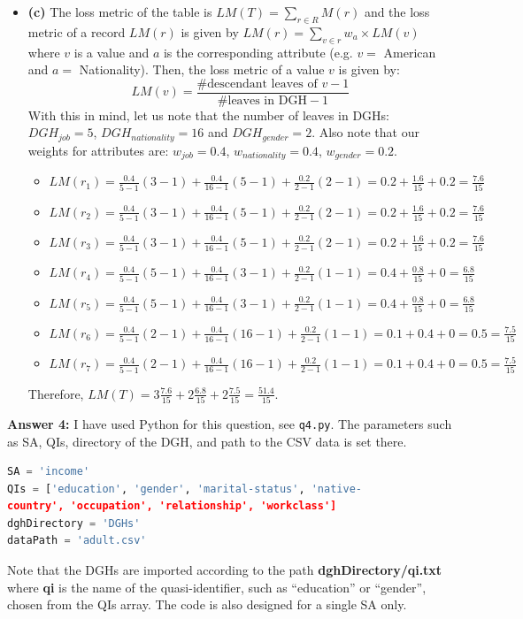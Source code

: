 \documentclass[12pt,reqno]{amsart}
\newcommand{\code}[1]{\texttt{#1}}
\begin{document}
\begin{itemize}[label=]
\item  \textbf{(c)} The loss metric of the table is $LM(T) = \sum_{r \in R}M(r)$ and the loss metric of a record $LM(r)$ is given by $LM(r) = \sum_{v \in r} w_{a} \times LM(v)$ where $v$ is a value and $a$ is the corresponding attribute (e.g. $v = $ American and $a = $ Nationality). Then, the loss metric of a value $v$ is given by:
$$
LM(v) = \frac{\text{\# descendant leaves of } v - 1 }{\text{\# leaves in DGH} - 1}
$$
With this in mind, let us note that the number of leaves in DGHs: $DGH_{job} = 5$, $DGH_{nationality} = 16$ and $DGH_{gender} = 2$. Also note that our weights for attributes are: $w_{job}=0.4$, $w_{nationality}=0.4$, $w_{gender}=0.2$.
\begin{itemize}[label=]
	\item $LM(r_1) = \frac{0.4}{5-1}(3-1) + \frac{0.4}{16-1}(5-1) + \frac{0.2}{2-1}(2-1) =  0.2 + \frac{1.6}{15} + 0.2 = \frac{7.6}{15}$ 
	\item $LM(r_2) = \frac{0.4}{5-1}(3-1) + \frac{0.4}{16-1}(5-1) + \frac{0.2}{2-1}(2-1) =  0.2 + \frac{1.6}{15} + 0.2 = \frac{7.6}{15}$ 
	\item $LM(r_3) = \frac{0.4}{5-1}(3-1) + \frac{0.4}{16-1}(5-1) + \frac{0.2}{2-1}(2-1) =  0.2 + \frac{1.6}{15} + 0.2 = \frac{7.6}{15}$ 
	\item $LM(r_4) = \frac{0.4}{5-1}(5-1) + \frac{0.4}{16-1}(3-1) + \frac{0.2}{2-1}(1-1) =  0.4 + \frac{0.8}{15} + 0 = \frac{6.8}{15}$ 
	\item $LM(r_5) = \frac{0.4}{5-1}(5-1) + \frac{0.4}{16-1}(3-1) + \frac{0.2}{2-1}(1-1) =  0.4 + \frac{0.8}{15} + 0 = \frac{6.8}{15}$ 
	\item $LM(r_6) = \frac{0.4}{5-1}(2-1) + \frac{0.4}{16-1}(16-1) + \frac{0.2}{2-1}(1-1) = 0.1 + 0.4 + 0 = 0.5 = \frac{7.5}{15}$ 
	\item $LM(r_7) = \frac{0.4}{5-1}(2-1) + \frac{0.4}{16-1}(16-1) + \frac{0.2}{2-1}(1-1) = 0.1 + 0.4 + 0 = 0.5 = \frac{7.5}{15}$ 
\end{itemize}
Therefore, $LM(T) = 3 \frac{7.6}{15} + 2  \frac{6.8}{15} + 2  \frac{7.5}{15} = \frac{51.4}{15}$.
\end{itemize}

\newpage
\textbf{Answer 4:} 
I have used Python for this question, see \code{q4.py}. The parameters such as SA, QIs, directory of the DGH, and path to the CSV data is set there. 
\begin{lstlisting}[language=python]
SA = 'income'
QIs = ['education', 'gender', 'marital-status', 'native-
country', 'occupation', 'relationship', 'workclass']
dghDirectory = 'DGHs'
dataPath = 'adult.csv'
\end{lstlisting}
Note that the DGHs are imported according to the path \textbf{dghDirectory/qi.txt} where \textbf{qi} is the name of the quasi-identifier, such as ``education'' or ``gender'', chosen from the QIs array. The code is also designed for a single SA only.
\end{document}
